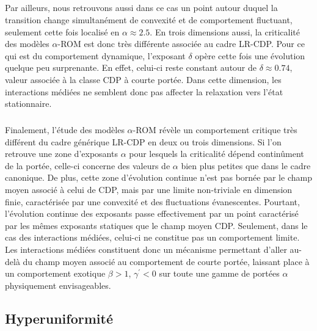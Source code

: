 \subparagraph{}Par ailleurs, nous retrouvons aussi dans ce cas un point autour duquel la transition change simultanément de convexité et de comportement fluctuant, seulement cette fois localisé en $\alpha\approx 2.5$. En trois dimensions aussi, la criticalité des modèles $\alpha$-ROM est donc très différente associée au cadre LR-CDP. Pour ce qui est du comportement dynamique, l'exposant $\delta$ opère cette fois une évolution quelque peu surprenante. En effet, celui-ci reste constant autour de $\delta \approx 0.74$, valeur associée à la classe CDP à courte portée. Dans cette dimension, les interactions médiées ne semblent donc pas affecter la relaxation vers l'état stationnaire.

\subparagraph{}Finalement, l'étude des modèles $\alpha$-ROM révèle un comportement critique très différent du cadre générique LR-CDP en deux ou trois dimensions. Si l'on retrouve une zone d'exposants $\alpha$ pour lesquels la criticalité dépend continûment de la portée, celle-ci concerne des valeurs de $\alpha$ bien plus petites que dans le cadre canonique. De plus, cette zone d'évolution continue n'est pas bornée par le champ moyen associé à celui de CDP, mais par une limite non-triviale en dimension finie, caractérisée par une convexité et des fluctuations évanescentes. Pourtant, l'évolution continue des exposants passe effectivement par un point caractérisé par les mêmes exposants statiques que le champ moyen CDP. Seulement, dans le cas des interactions médiées, celui-ci ne constitue pas un comportement limite. Les interactions médiées constituent donc un mécanisme permettant d'aller au-delà du champ moyen associé au comportement de courte portée, laissant place à un comportement exotique $\beta >1$, $\gamma^\prime<0$ sur toute une gamme de portées $\alpha$ physiquement envisageables.

\subsection{Hyperuniformité}

\label{sec:TBLRRHU}

